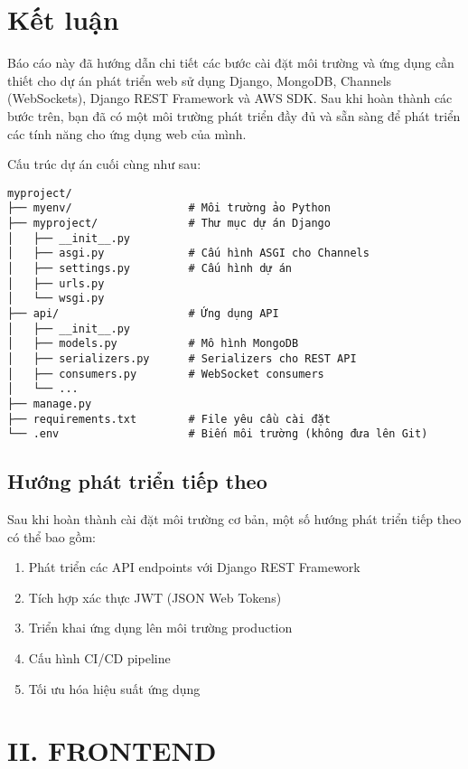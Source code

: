 \documentclass[12pt,a4paper]{article}
\begin{document}
\section{Kết luận}

Báo cáo này đã hướng dẫn chi tiết các bước cài đặt môi trường và ứng dụng cần thiết cho dự án phát triển web sử dụng Django, MongoDB, Channels (WebSockets), Django REST Framework và AWS SDK. Sau khi hoàn thành các bước trên, bạn đã có một môi trường phát triển đầy đủ và sẵn sàng để phát triển các tính năng cho ứng dụng web của mình.

Cấu trúc dự án cuối cùng như sau:

\begin{lstlisting}
myproject/
├── myenv/                  # Môi trường ảo Python
├── myproject/              # Thư mục dự án Django
│   ├── __init__.py
│   ├── asgi.py             # Cấu hình ASGI cho Channels
│   ├── settings.py         # Cấu hình dự án
│   ├── urls.py
│   └── wsgi.py
├── api/                    # Ứng dụng API
│   ├── __init__.py
│   ├── models.py           # Mô hình MongoDB
│   ├── serializers.py      # Serializers cho REST API
│   ├── consumers.py        # WebSocket consumers
│   └── ...
├── manage.py
├── requirements.txt        # File yêu cầu cài đặt
└── .env                    # Biến môi trường (không đưa lên Git)
\end{lstlisting}

\subsection{Hướng phát triển tiếp theo}

Sau khi hoàn thành cài đặt môi trường cơ bản, một số hướng phát triển tiếp theo có thể bao gồm:

\begin{enumerate}
    \item Phát triển các API endpoints với Django REST Framework
    \item Tích hợp xác thực JWT (JSON Web Tokens)
    \item Triển khai ứng dụng lên môi trường production
    \item Cấu hình CI/CD pipeline
    \item Tối ưu hóa hiệu suất ứng dụng
\end{enumerate}

\section*{II. FRONTEND}
\end{document}
